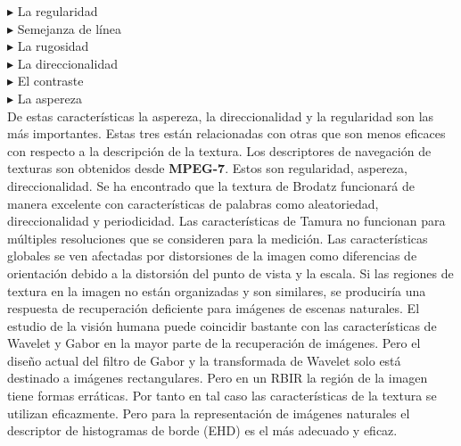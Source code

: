 \documentclass{llncs}
\begin{document}
\noindent$\blacktriangleright $ La regularidad\\
$\blacktriangleright $ Semejanza de l\'inea\\
$\blacktriangleright $ La rugosidad\\
$\blacktriangleright $ La direccionalidad\\
$\blacktriangleright $ El contraste\\
$\blacktriangleright $ La aspereza\\

De estas caracter\'isticas la aspereza, la direccionalidad y la regularidad son las m\'as importantes. Estas tres est\'an relacionadas 
con otras que son menos eficaces con respecto a la descripci\'on de la textura. Los descriptores de navegaci\'on de texturas son 
obtenidos desde \textbf{MPEG-7}. Estos son regularidad, aspereza, direccionalidad. Se ha encontrado que la textura de Brodatz funcionar\'a
de manera excelente con caracter\'isticas de palabras como aleatoriedad, direccionalidad y periodicidad. Las caracter\'isticas de Tamura
no funcionan para m\'ultiples resoluciones que se consideren para la medici\'on. Las caracter\'isticas globales se ven afectadas por 
distorsiones de la imagen como diferencias de orientaci\'on debido a la distorsi\'on del punto de vista y la escala. Si las regiones
de textura en la imagen no est\'an organizadas y son similares, se producir\'ia una respuesta de recuperaci\'on deficiente para im\'agenes
de escenas naturales. El estudio de la visi\'on humana puede coincidir bastante con las caracter\'isticas de Wavelet y Gabor en la mayor 
parte de la recuperaci\'on de im\'agenes. Pero el dise\~{n}o actual del filtro de Gabor y la transformada de Wavelet solo est\'a 
destinado a im\'agenes rectangulares. Pero en un RBIR la regi\'on  de la imagen tiene formas err\'aticas. Por tanto en tal caso las 
caracter\'isticas de la textura se utilizan eficazmente. Pero para la representaci\'on de im\'agenes naturales el descriptor de histogramas
de borde (EHD) es el m\'as adecuado y eficaz.\\
\end{document}
